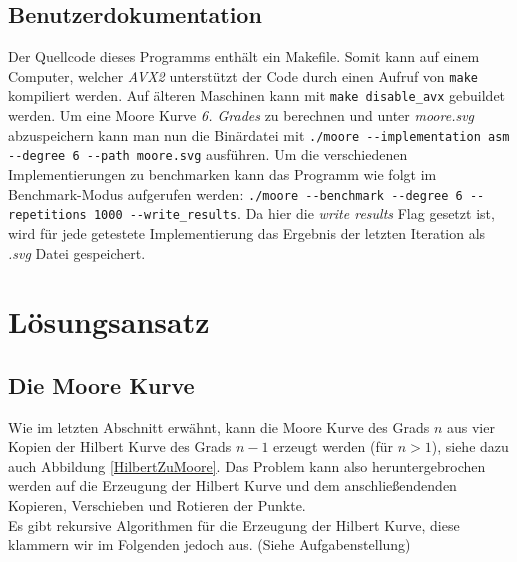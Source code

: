 \documentclass[course=erap]{aspdoc}
\begin{document}
\subsection{Benutzerdokumentation}
Der Quellcode dieses Programms enthält ein Makefile. Somit kann auf einem Computer, welcher \textit{AVX2} unterstützt der Code durch einen Aufruf von \texttt{make} kompiliert werden. Auf älteren Maschinen kann mit \texttt{make disable\_avx} gebuildet werden.
\newline
Um eine Moore Kurve \textit{6. Grades} zu berechnen und unter \textit{moore.svg} abzuspeichern kann man nun die Binärdatei mit \texttt{./moore -{}-implementation asm -{}-degree 6 -{}-path moore.svg} ausführen. 
Um die verschiedenen Implementierungen zu benchmarken kann das Programm wie folgt im Benchmark-Modus aufgerufen werden: \texttt{./moore -{}-benchmark -{}-degree 6 -{}-repetitions 1000 -{}-write\_results}. Da hier die \textit{write results} Flag gesetzt ist, wird für jede getestete Implementierung das Ergebnis der letzten Iteration als \textit{.svg} Datei gespeichert. 

\section{Lösungsansatz}

\subsection{Die Moore Kurve}

Wie im letzten Abschnitt erwähnt, kann die Moore Kurve des Grads $n$ aus vier Kopien der Hilbert Kurve des Grads $n-1$ erzeugt werden (für $n > 1$), siehe dazu auch Abbildung \ref{HilbertZuMoore}.
Das Problem kann also heruntergebrochen werden auf die Erzeugung der Hilbert Kurve und dem anschließendenden Kopieren, Verschieben und Rotieren der Punkte. 
\\
Es gibt rekursive Algorithmen für die Erzeugung der Hilbert Kurve, diese klammern wir im Folgenden jedoch aus. (Siehe Aufgabenstellung)
\FloatBarrier
\end{document}
